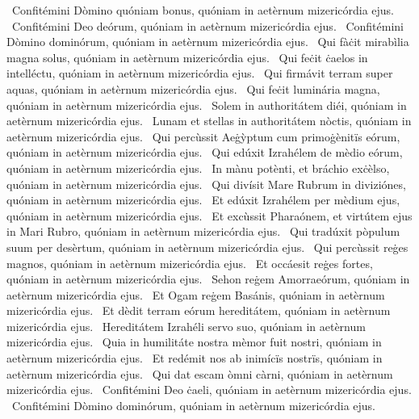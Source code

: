 \psalmChapterWithInscription{}
{ }
{%
~Confitémini Dòmino quóniam bonus, quóniam in aetèrnum mizericórdia ejus. 
~Confitémini Deo deórum, quóniam in aetèrnum mizericórdia ejus. 
~Confitémini Dòmino dominórum, quóniam in aetèrnum mizericórdia ejus. 
~Qui fàċit mirabìlia magna solus, quóniam in aetèrnum mizericórdia ejus. 
~Qui feċit ċaelos in intelléctu, quóniam in aetèrnum mizericórdia ejus. 
~Qui firmávit terram super aquas, quóniam in aetèrnum mizericórdia ejus. 
~Qui feċit luminária magna, quóniam in aetèrnum mizericórdia ejus. 
~Solem in authoritátem diéi, quóniam in aetèrnum mizericórdia ejus. 
~Lunam et stellas in authoritátem nòctis, quóniam in aetèrnum mizericórdia ejus. 
~Qui percùssit Aeġỳptum cum primoġènitïs eórum, quóniam in aetèrnum mizericórdia ejus. 
~Qui edúxit Izrahélem de mèdio eórum, quóniam in aetèrnum mizericórdia ejus. 
~In mànu potènti, et bráchio exċèlso, quóniam in aetèrnum mizericórdia ejus. 
~Qui divísit Mare Rubrum in diviziónes, quóniam in aetèrnum mizericórdia ejus. 
~Et edúxit Izrahélem per mèdium ejus, quóniam in aetèrnum mizericórdia ejus. 
~Et excùssit Pharaónem, et virtútem ejus in Mari Rubro, quóniam in aetèrnum mizericórdia ejus. 
~Qui tradúxit pòpulum suum per desèrtum, quóniam in aetèrnum mizericórdia ejus. 
~Qui percùssit reġes magnos, quóniam in aetèrnum mizericórdia ejus. 
~Et occáesit reġes fortes, quóniam in aetèrnum mizericórdia ejus. 
~Sehon reġem Amorraeórum, quóniam in aetèrnum mizericórdia ejus. 
~Et Ogam reġem Basánis, quóniam in aetèrnum mizericórdia ejus. 
~Et dèdit terram eórum hereditátem, quóniam in aetèrnum mizericórdia ejus. 
~Hereditátem Izrahéli servo suo, quóniam in aetèrnum mizericórdia ejus. 
~Quia in humilitáte nostra mèmor fuit nostri, quóniam in aetèrnum mizericórdia ejus. 
~Et redémit nos ab inimícïs nostrïs, quóniam in aetèrnum mizericórdia ejus. 
~Qui dat escam òmni càrni, quóniam in aetèrnum mizericórdia ejus. 
~Confitémini Deo ċaeli, quóniam in aetèrnum mizericórdia ejus. 
~Confitémini Dòmino dominórum, quóniam in aetèrnum mizericórdia ejus. 
}
